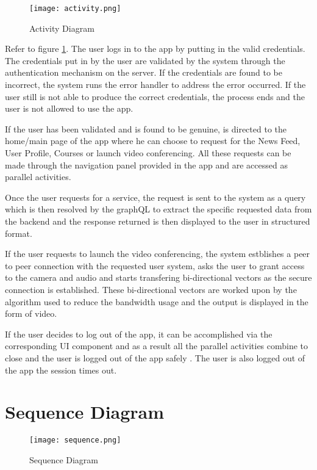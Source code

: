 \begin{figure}[h!]
    \begin{center}
        \texttt{[image: activity.png]}
    \end{center}
    \caption{Activity Diagram}
    \label{fig:activity}
\end{figure}

Refer to figure \ref{fig:activity}. The user logs in to the app by putting in the valid credentials.
The credentials put in by the user are validated by the system through the authentication mechanism on the server.
If the credentials are found to be incorrect, the system runs the error handler to address the error occurred.
If the user still is not able to produce the correct credentials, the process ends and the user is not allowed to use the app.

If the user has been validated and is found to be genuine, is directed to the home/main page of the app where he can choose to request for the News Feed, User Profile, Courses or launch video conferencing.
All these requests can be made through the navigation panel provided in the app and are accessed as parallel activities.

Once the user requests for a service, the request is sent to the system as a query which is then resolved by the graphQL to extract the specific requested data from the backend and the response returned is then displayed to the user in structured format.

If the user requests to launch the video conferencing, the system estblishes a peer to peer connection with the requested user system, asks the user to grant access to the camera and audio and starts transfering bi-directional vectors as the secure connection is established.
These bi-directional vectors are worked upon by the algorithm used to reduce the bandwidth usage and the output is displayed in the form of video.

If the user decides to log out of the app, it can be accomplished via the corresponding UI component and as a result all the parallel activities combine to close and the user is logged out of the app safely .
The user is also logged out of the app the session times out.


\section{Sequence Diagram}

\begin{figure}[h!]
    \begin{center}
        \texttt{[image: sequence.png]}
    \end{center}
    \caption{Sequence Diagram}
    \label{fig:sequence}
\end{figure}

